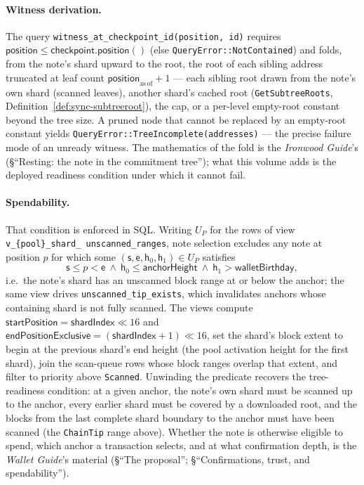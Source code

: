 \documentclass[11pt,a4paper]{article}
\theoremstyle{definition}
\begin{document}
\paragraph{Witness derivation.} The query
\texttt{witness\_at\_checkpoint\_id(position, id)} requires
$\mathsf{position} \le \mathsf{checkpoint.position}()$ (else
\texttt{QueryError::NotContained}) and folds, from the note's shard
upward to the root, the root of each sibling address truncated at leaf
count $\mathsf{position}_{\mathrm{as\,of}} + 1$ --- each sibling root
drawn from the note's own shard (scanned leaves), another shard's cached
root (\texttt{GetSubtreeRoots},
Definition~\ref{def:sync-subtreeroot}), the cap, or a per-level
empty-root constant beyond the tree size. A pruned node that cannot be
replaced by an empty-root constant yields
\texttt{QueryError::}\allowbreak\texttt{TreeIncomplete(addresses)} ---
the precise failure
mode of an unready witness. The mathematics of the fold is the
\emph{Ironwood Guide}'s (\S``Resting: the note in the commitment tree''); what
this volume adds is the deployed
readiness condition under which it cannot fail.

\paragraph{Spendability.} That condition is enforced in SQL. Writing
$U_P$ for the rows of view
\texttt{v\_\{pool\}\_\allowbreak shard\_\allowbreak
unscanned\_\allowbreak ranges}, note selection excludes
any note at position $p$ for which some
$(\mathsf{s}, \mathsf{e}, \mathsf{h}_0, \mathsf{h}_1) \in U_P$ satisfies
\[
\mathsf{s} \le p < \mathsf{e}
\ \wedge\
\mathsf{h}_0 \le \mathsf{anchorHeight}
\ \wedge\
\mathsf{h}_1 > \mathsf{walletBirthday},
\]
i.e.\ the note's shard has an unscanned block range at or below the
anchor; the same view drives \texttt{unscanned\_tip\_exists}, which
invalidates anchors whose containing shard is not fully scanned.
The views compute
$\mathsf{startPosition} = \mathsf{shardIndex} \ll 16$ and
$\mathsf{endPositionExclusive} = (\mathsf{shardIndex} + 1) \ll 16$, set
the shard's block extent to begin at the previous shard's end height
(the pool activation height for the first shard), join the scan-queue
rows whose block ranges overlap that extent, and filter to priority
above \texttt{Scanned}.
Unwinding the predicate recovers the tree-readiness condition: at a given
anchor, the note's own shard must be scanned up to the anchor, every earlier
shard must be covered by a downloaded root, and the blocks from the last
complete shard boundary to the anchor must have been scanned (the
\texttt{ChainTip} range above). Whether the note is otherwise eligible to
spend, which anchor a transaction selects, and at what confirmation depth,
is the \emph{Wallet Guide}'s material (\S``The proposal'';
\S``Confirmations, trust, and spendability'').
\end{document}
